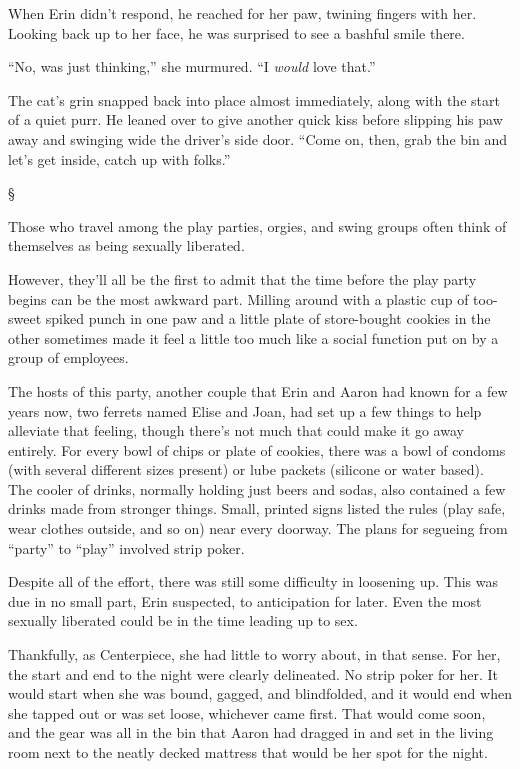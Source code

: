 \documentclass[12pt,letterpaper,oneside]{memoir}
\newcommand\secdiv{
  \begin{center}
    \S
  \end{center}
}
\begin{document}
  When Erin didn't respond, he reached for her paw, twining fingers with her. Looking back up to her face, he was surprised to see a bashful smile there.

  ``No, was just thinking,'' she murmured. ``I \textit{would} love that.''

  The cat's grin snapped back into place almost immediately, along with the start of a quiet purr. He leaned over to give another quick kiss before slipping his paw away and swinging wide the driver's side door. ``Come on, then, grab the bin and let's get inside, catch up with folks.''

  \secdiv

  Those who travel among the play parties, orgies, and swing groups often think of themselves as being sexually liberated.

  However, they'll all be the first to admit that the time before the play party begins can be the most awkward part. Milling around with a plastic cup of too-sweet spiked punch in one paw and a little plate of store-bought cookies in the other sometimes made it feel a little too much like a social function put on by a group of employees.

  The hosts of this party, another couple that Erin and Aaron had known for a few years now, two ferrets named Elise and Joan, had set up a few things to help alleviate that feeling, though there's not much that could make it go away entirely. For every bowl of chips or plate of cookies, there was a bowl of condoms (with several different sizes present) or lube packets (silicone or water based). The cooler of drinks, normally holding just beers and sodas, also contained a few drinks made from stronger things. Small, printed signs listed the rules (play safe, wear clothes outside, and so on) near every doorway. The plans for segueing from ``party'' to ``play'' involved strip poker.

  Despite all of the effort, there was still some difficulty in loosening up. This was due in no small part, Erin suspected, to anticipation for later. Even the most sexually liberated could be in the time leading up to sex.

  Thankfully, as Centerpiece, she had little to worry about, in that sense. For her, the start and end to the night were clearly delineated. No strip poker for her. It would start when she was bound, gagged, and blindfolded, and it would end when she tapped out or was set loose, whichever came first. That would come soon, and the gear was all in the bin that Aaron had dragged in and set in the living room next to the neatly decked mattress that would be her spot for the night.
\end{document}
